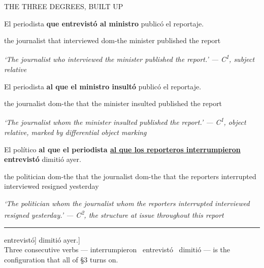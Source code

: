 \documentclass[11pt, a4paper]{article}
\newcommand{\gloss}[1]{%
  {\small\ttfamily\color{midgray}\RaggedRight #1\par}
}
\newcommand{\translation}[1]{%
  {\small\itshape\color{midgray}#1}\par
}
\begin{document}
\begin{tcolorbox}[colback=panelgray, colframe=oxblood, boxrule=0pt, leftrule=2.6pt, arc=0pt, left=14pt, right=14pt, top=10pt, bottom=10pt, breakable]
{\ttfamily\small\color{oxblood}\MakeUppercase{The three degrees, built up}}\par
\vspace{0.8em}

\begin{xlist}
\item[(1)] \normalfont\normalsize\upshape\color{inkgray} El periodista \textbf{que entrevistó al ministro} publicó el reportaje.\par
\gloss{the journalist that interviewed dom-the minister published the report}
\translation{`The journalist who interviewed the minister published the report.' --- C\textsuperscript{1}, subject relative}

\item[(2)] \normalfont\normalsize\upshape\color{inkgray} El periodista \textbf{al que el ministro insultó} publicó el reportaje.\par
\gloss{the journalist dom-the that the minister insulted published the report}
\translation{`The journalist whom the minister insulted published the report.' --- C\textsuperscript{1}, object relative, marked by differential object marking}

\item[(3)] \normalfont\normalsize\upshape\color{inkgray} El político \textbf{al que el periodista \underline{al que los reporteros interrumpieron} entrevistó} dimitió ayer.\par
\gloss{the politician dom-the that the journalist dom-the that the reporters interrupted interviewed resigned yesterday}
\translation{`The politician whom the journalist whom the reporters interrupted interviewed resigned yesterday.' --- C\textsuperscript{2}, the structure at issue throughout this report}
\end{xlist}

\vspace{0.4em}
\noindent\rule{\linewidth}{0.4pt}\par
\vspace{0.6em}
{\footnotesize\ttfamily [\textsubscript{M} El político [\textsubscript{C-1} al que el periodista [\textsubscript{C-2} al que los reporteros interrumpieron] entrevistó] dimitió ayer.]\\[2pt]
\color{midgray}Three consecutive verbs --- interrumpieron \textperiodcentered\ entrevistó \textperiodcentered\ dimitió --- is the configuration that all of \S3 turns on.}
\end{tcolorbox}
\end{document}
